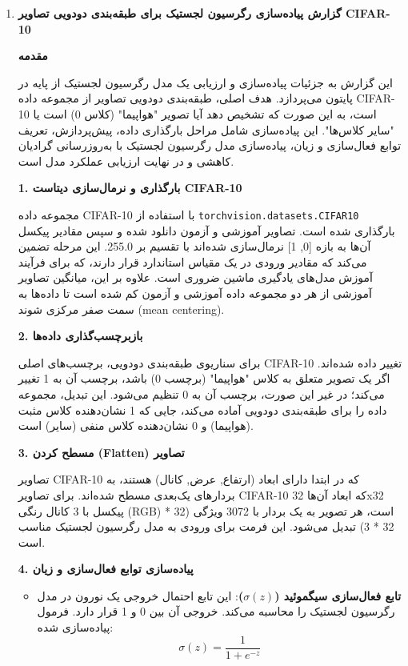 \begin{enumerate}
	\item \textbf{گزارش پیاده‌سازی رگرسیون لجستیک برای طبقه‌بندی دودویی تصاویر CIFAR-10}
	
	\textbf{مقدمه}
	
	این گزارش به جزئیات پیاده‌سازی و ارزیابی یک مدل رگرسیون لجستیک از پایه در پایتون می‌پردازد. هدف اصلی، طبقه‌بندی دودویی تصاویر از مجموعه داده CIFAR-10 است، به این صورت که تشخیص دهد آیا تصویر "هواپیما" (کلاس 0) است یا "سایر کلاس‌ها". این پیاده‌سازی شامل مراحل بارگذاری داده، پیش‌پردازش، تعریف توابع فعال‌سازی و زیان، پیاده‌سازی مدل رگرسیون لجستیک با به‌روزرسانی گرادیان کاهشی و در نهایت ارزیابی عملکرد مدل است.
	
	\textbf{1. بارگذاری و نرمال‌سازی دیتاست CIFAR-10}
	
	مجموعه داده CIFAR-10 با استفاده از \texttt{torchvision.datasets.CIFAR10} بارگذاری شده است. تصاویر آموزشی و آزمون دانلود شده و سپس مقادیر پیکسل آن‌ها به بازه [0, 1] نرمال‌سازی شده‌اند با تقسیم بر 255.0. این مرحله تضمین می‌کند که مقادیر ورودی در یک مقیاس استاندارد قرار دارند، که برای فرآیند آموزش مدل‌های یادگیری ماشین ضروری است. علاوه بر این، میانگین تصاویر آموزشی از هر دو مجموعه داده آموزشی و آزمون کم شده است تا داده‌ها به سمت صفر مرکزی شوند (mean centering).
	
	\textbf{2. بازبرچسب‌گذاری داده‌ها}
	
	برای سناریوی طبقه‌بندی دودویی، برچسب‌های اصلی CIFAR-10 تغییر داده شده‌اند. اگر یک تصویر متعلق به کلاس "هواپیما" (برچسب 0) باشد، برچسب آن به 1 تغییر می‌کند؛ در غیر این صورت، برچسب آن به 0 تنظیم می‌شود. این تبدیل، مجموعه داده را برای طبقه‌بندی دودویی آماده می‌کند، جایی که 1 نشان‌دهنده کلاس مثبت (هواپیما) و 0 نشان‌دهنده کلاس منفی (سایر) است.
	
	\textbf{3. مسطح کردن (Flatten) تصاویر}
	
	تصاویر CIFAR-10 که در ابتدا دارای ابعاد (ارتفاع, عرض, کانال) هستند، به بردارهای یک‌بعدی مسطح شده‌اند. برای تصاویر CIFAR-10 که ابعاد آن‌ها 32x32 پیکسل با 3 کانال رنگی (RGB) است، هر تصویر به یک بردار با 3072 ویژگی (32 * 32 * 3) تبدیل می‌شود. این فرمت برای ورودی به مدل رگرسیون لجستیک مناسب است.
	
	\textbf{4. پیاده‌سازی توابع فعال‌سازی و زیان}
	
	\begin{itemize}
		\item \textbf{تابع فعال‌سازی سیگموئید ($\sigma(z)$)}: این تابع احتمال خروجی یک نورون در مدل رگرسیون لجستیک را محاسبه می‌کند. خروجی آن بین 0 و 1 قرار دارد. فرمول پیاده‌سازی شده:
		$$\sigma(z) = \frac{1}{1 + e^{-z}}$$
		

\end{itemize}
\end{enumerate}
